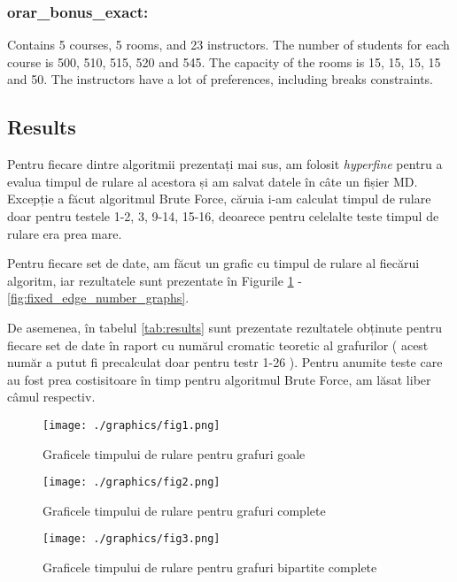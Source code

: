 \documentclass[runningheads]{paper}
\begin{document}
\subsubsection{orar\_bonus\_exact:} Contains 5 courses, 5 rooms, and 23 instructors. The
number of students for each course is 500, 510, 515, 520 and 545. The capacity of the rooms is
15, 15, 15, 15 and 50. The instructors have a lot of preferences, including breaks constraints.

\subsection{Results}
Pentru fiecare dintre algoritmii prezentați mai sus, am folosit \textit{hyperfine}
pentru a evalua timpul de rulare al acestora și am salvat datele în câte un fișier
MD. Excepție a făcut algoritmul Brute Force, căruia i-am calculat timpul de rulare
doar pentru testele 1-2, 3, 9-14, 15-16, deoarece pentru celelalte teste timpul de
rulare era prea mare.

Pentru fiecare set de date, am făcut un grafic cu timpul de rulare al fiecărui
algoritm, iar rezultatele sunt prezentate în Figurile \ref{fig:empty_graphs} - \ref{fig:fixed_edge_number_graphs}.

De asemenea, în tabelul \ref{tab:results} sunt prezentate rezultatele obținute
pentru fiecare set de date în raport cu numărul cromatic teoretic al grafurilor (
    acest număr a putut fi precalculat doar pentru testr 1-26
).
Pentru anumite teste care au fost prea costisitoare în timp pentru algoritmul Brute Force, am
lăsat liber câmul respectiv.
\pagebreak

\begin{figure}[!]
\centering
\texttt{[image: ./graphics/fig1.png]}
\caption{Graficele timpului de rulare pentru grafuri goale}
\label{fig:empty_graphs}
\end{figure}

\begin{figure}[!]
\centering
\texttt{[image: ./graphics/fig2.png]}
\caption{Graficele timpului de rulare pentru grafuri complete}
\label{fig:complete_graphs}
\end{figure}

\begin{figure}[!]
\centering
\texttt{[image: ./graphics/fig3.png]}
\caption{Graficele timpului de rulare pentru grafuri bipartite complete}
\label{fig:bipartite_complete_graphs}
\end{figure}
\end{document}
